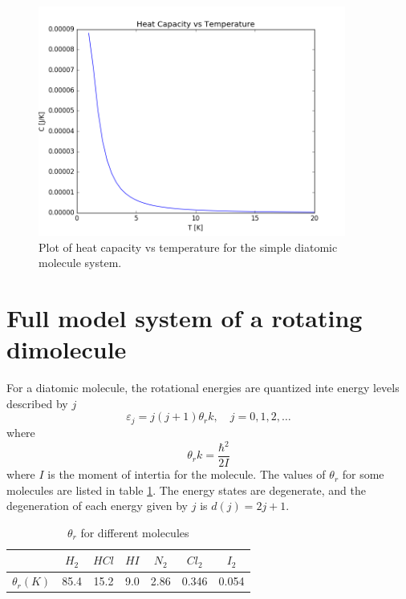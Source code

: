 \documentclass[10pt,a4paper]{amsart}
\begin{document}
\begin{figure}
	\includegraphics[width=0.9\textwidth]{figures/heatcapsimple.png}
	\caption{Plot of heat capacity vs temperature for the simple 			diatomic molecule system.}
	\label{fig:heatcap1}
\end{figure}

\section{Full model system of a rotating dimolecule}

For a diatomic molecule, the rotational energies are quantized inte energy levels described by $j$
\begin{equation}
\varepsilon_j=j(j+1)\theta_r k, \quad j=0,1,2,\dots
\end{equation}
where
\begin{equation}
\theta_r k= \frac{\hbar^2}{2I}
\end{equation}
where $I$ is the moment of intertia for the molecule. The values of $\theta_r$ for some molecules are listed in table \ref{tab:thetar}. The energy states are degenerate, and the degeneration of each energy given by $j$ is $d(j)=2j+1$.

\begin{table}
	\centering
	\caption{$\theta_r$ for different molecules}
	\begin{tabular}{ccccccc} \hline
 	 & $H_2$ & $HCl$ & $HI$ & $N_2$ & $Cl_2$ & $I_2$ \\ \hline
	$\theta_r(K)$ & 85.4 & 15.2 & 9.0 & 2.86 & 0.346 & 0.054 \\ \hline
	\end{tabular}
	\label{tab:thetar}
\end{table} 
\end{document}
